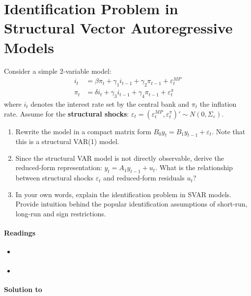 \section[Identification Problem in Structural Vector Autoregressive Models]{Identification Problem in Structural Vector Autoregressive Models\label{ex:IdentificationProblemSVAR}}
Consider a simple 2-variable model:
\begin{align*}
i_t &=  \beta \pi_t + \gamma_1 i_{t-1} + \gamma_2 \pi_{t-1} + \varepsilon_t^{MP}
\\
\pi_t &=  \delta i_t + \gamma_3 i_{t-1} + \gamma_4 \pi_{t-1} + \varepsilon_t^{\pi}
\end{align*}
where \(i_t\) denotes the interest rate set by the central bank and \(\pi_t\) the inflation rate.
Assume for the \textbf{structural shocks}:
\(\varepsilon_{t}=(\varepsilon_t^{MP}, \varepsilon_t^{\pi})' \sim N(0,\Sigma_\varepsilon)\).

\begin{enumerate}

\item
Rewrite the model in a compact matrix form \(B_0 y_t = B_1 y_{t-1} + \varepsilon_{t}\).
Note that this is a structural VAR{(1)} model.

\item
Since the structural VAR model is not directly observable, derive the reduced-form representation:
\(y_t = A_1 y_{t-1} + u_t\).
What is the relationship between structural shocks \(\varepsilon_t\) and reduced-form residuals \(u_t\)?

\item
In your own words, explain the identification problem in SVAR models.
Provide intuition behind the popular identification assumptions of short-run, long-run and sign restrictions.

\end{enumerate}

\paragraph{Readings}
\begin{itemize}
\item \textcite[Ch.~7.6]{Kilian.Lutkepohl_2017_StructuralVectorAutoregressive}
\item \textcite{Wolf_2022_WhatCanWe}
\end{itemize}

\begin{solution}\textbf{Solution to }
\ifDisplaySolutions%

\fi
\newpage
\end{solution}